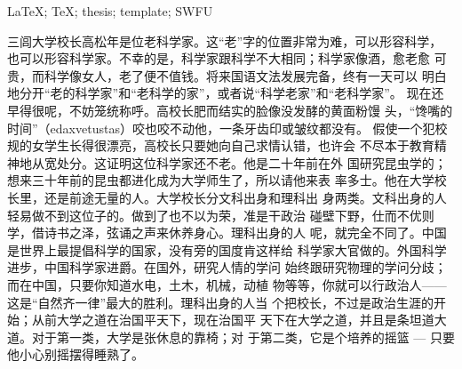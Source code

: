 \documentclass{swfuthesis}
\begin{document}
\begin{EKeyword} %
  \LaTeX{}; \TeX{}; thesis; template; SWFU
\end{EKeyword}

\tableofcontents %
\clearpage
\listoffigures %
\clearpage
\listoftables  %

\mainmatter






\appendix %

\makebib %

\begin{advisorInfo} %
  三闾大学校长高松年是位老科学家。这“老”字的位置非常为难，可以形容科学，
  也可以形容科学家。不幸的是，科学家跟科学不大相同；科学家像酒，愈老愈
  可贵，而科学像女人，老了便不值钱。将来国语文法发展完备，终有一天可以
  明白地分开“老的科学家”和“老科学的家”，或者说“科学老家”和“老科学家”。
  现在还早得很呢，不妨笼统称呼。高校长肥而结实的脸像没发酵的黄面粉馒
  头，“馋嘴的时间”（edaxvetustas）咬也咬不动他，一条牙齿印或皱纹都没有。
  假使一个犯校规的女学生长得很漂亮，高校长只要她向自己求情认错，也许会
  不尽本于教育精神地从宽处分。这证明这位科学家还不老。他是二十年前在外
  国研究昆虫学的；想来三十年前的昆虫都进化成为大学师生了，所以请他来表
  率多士。他在大学校长里，还是前途无量的人。大学校长分文科出身和理科出
  身两类。文科出身的人轻易做不到这位子的。做到了也不以为荣，准是干政治
  碰壁下野，仕而不优则学，借诗书之泽，弦诵之声来休养身心。理科出身的人
  呢，就完全不同了。中国是世界上最提倡科学的国家，没有旁的国度肯这样给
  科学家大官做的。外国科学进步，中国科学家进爵。在国外，研究人情的学问
  始终跟研究物理的学问分歧；而在中国，只要你知道水电，土木，机械，动植
  物等等，你就可以行政治人——这是“自然齐一律”最大的胜利。理科出身的人当
  个把校长，不过是政治生涯的开始；从前大学之道在治国平天下，现在治国平
  天下在大学之道，并且是条坦道大道。对于第一类，大学是张休息的靠椅；对
  于第二类，它是个培养的摇篮 --- 只要他小心别摇摆得睡熟了。


\end{advisorInfo}
\end{document}
